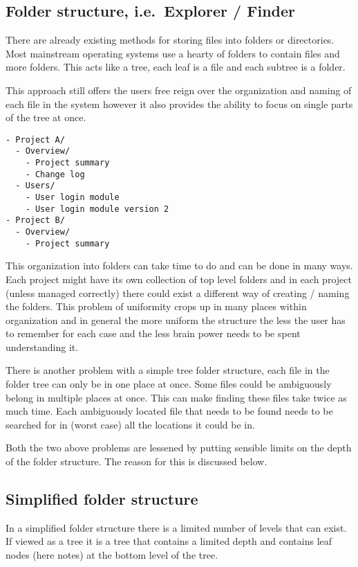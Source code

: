 \subsection{Folder structure, i.e.~Explorer /
Finder}\label{folder-structure-i.e.explorer-finder}

There are already existing methods for storing files into folders or
directories. Most mainstream operating systems use a hearty of folders
to contain files and more folders. This acts like a tree, each leaf is a
file and each subtree is a folder.

This approach still offers the users free reign over the organization
and naming of each file in the system however it also provides the
ability to focus on single parts of the tree at once.

\begin{verbatim}
- Project A/
  - Overview/
    - Project summary
    - Change log
  - Users/
    - User login module
    - User login module version 2
- Project B/
  - Overview/
    - Project summary
\end{verbatim}

This organization into folders can take time to do and can be done in
many ways. Each project might have its own collection of top level
folders and in each project (unless managed correctly) there could exist
a different way of creating / naming the folders. This problem of
uniformity crops up in many places within organization and in general
the more uniform the structure the less the user has to remember for
each case and the less brain power needs to be spent understanding it.

There is another problem with a simple tree folder structure, each file
in the folder tree can only be in one place at once. Some files could be
ambiguously belong in multiple places at once. This can make finding
these files take twice as much time. Each ambiguously located file that
needs to be found needs to be searched for in (worst case) all the
locations it could be in.

Both the two above problems are lessened by putting sensible limits on
the depth of the folder structure. The reason for this is discussed
below.

\subsection{Simplified folder
structure}\label{simplified-folder-structure}

In a simplified folder structure there is a limited number of levels
that can exist. If viewed as a tree it is a tree that contains a limited
depth and contains leaf nodes (here notes) at the bottom level of the
tree.

